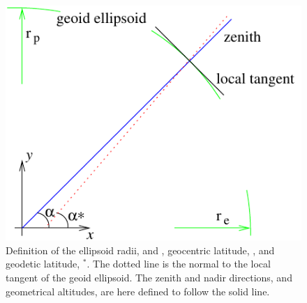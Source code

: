 \begin{figure}
 \begin{center}
  \begin{minipage}[c]{0.65\textwidth}
   \begin{center}
    \includegraphics*[width=0.9\hsize]{latitudes}
   \end{center}
  \end{minipage}%
  \begin{minipage}[c]{0.35\textwidth}
   \caption{Definition of the ellipsoid radii,  and , 
     geocentric latitude, \Lat, and geodetic latitude, \Lat$^*$. The
     dotted line is the normal to the local tangent of the geoid
     ellipsoid. The zenith and nadir directions, and geometrical
     altitudes, are here defined to follow the solid line.}
   \label{fig:ppath:lats}
  \end{minipage}
 \end{center}
\end{figure}   

